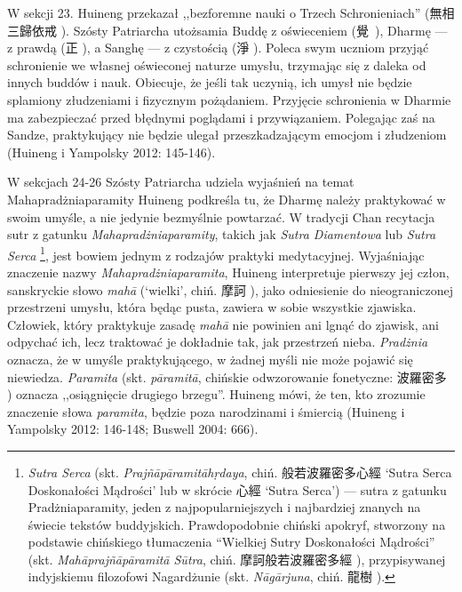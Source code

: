 W sekcji 23. Huineng przekazał ,,bezforemne nauki o Trzech Schronieniach\fnm'' (無相三歸依戒 ).
Szósty Patriarcha utożsamia Buddę z oświeceniem (覺~), Dharmę --- z prawdą (正 ), a Sanghę --- z czystością (淨 ).
Poleca swym uczniom przyjąć schronienie we własnej oświeconej naturze umysłu, trzymając się z daleka od innych buddów i nauk.
Obiecuje, że jeśli tak uczynią, ich umysł nie będzie splamiony złudzeniami i fizycznym pożądaniem.
Przyjęcie schronienia w Dharmie ma zabezpieczać przed błędnymi poglądami i przywiązaniem.
Polegając zaś na Sandze, praktykujący nie będzie ulegał przeszkadzającym emocjom i złudzeniom
(Huineng i Yampolsky 2012: 145-146).

W sekcjach 24-26 Szósty Patriarcha udziela wyjaśnień na temat Mahapradżniaparamity%
Huineng podkreśla tu, że Dharmę należy praktykować w swoim umyśle, a nie jedynie bezmyślnie powtarzać.
W tradycji Chan recytacja sutr z gatunku \textit{Mahapradżniaparamity}, takich jak \textit{Sutra Diamentowa} lub \textit{Sutra Serca}%
\footnote{\textit{Sutra Serca}\label{HeartSutra} (skt. \textit{Prajñāpāramitāh\d{r}daya}, chiń. 般若波羅密多心經  `Sutra Serca Doskonałości Mądrości' lub w skrócie 心經  `Sutra Serca') --- sutra z gatunku Pradżniaparamity, jeden z najpopularniejszych i najbardziej znanych na świecie tekstów buddyjskich. Prawdopodobnie chiński apokryf, stworzony na podstawie chińskiego tłumaczenia ``Wielkiej Sutry Doskonałości Mądrości'' (skt. \textit{Mahāprajñāpāramitā Sūtra}, chiń. 摩訶般若波羅密多經 ), przypisywanej indyjskiemu filozofowi Nagardżunie (skt. \textit{Nāgārjuna}, chiń. 龍樹 ).},
jest bowiem jednym z rodzajów praktyki medytacyjnej.
Wyjaśniając znaczenie nazwy \textit{Mahapradżniaparamita}, Huineng interpretuje pierwszy jej człon, sanskryckie słowo \textit{mahā} (`wielki', chiń. 摩訶 ), jako odniesienie do nieograniczonej przestrzeni umysłu, która będąc pusta, zawiera w sobie wszystkie zjawiska.
Człowiek, który praktykuje zasadę \textit{mahā} nie powinien ani lgnąć do zjawisk, ani odpychać ich, lecz traktować je dokładnie tak, jak przestrzeń nieba.
\textit{Pradżnia} oznacza, że w umyśle praktykującego, w żadnej myśli nie może pojawić się niewiedza.
\textit{Paramita} (skt. \textit{pāramitā}, chińskie odwzorowanie fonetyczne: 波羅密多 ) oznacza ,,osiągnięcie drugiego brzegu''.
Huineng mówi, że ten, kto zrozumie znaczenie słowa \textit{paramita}, będzie poza narodzinami i śmiercią
(Huineng i Yampolsky 2012: 146-148; Buswell 2004: 666).


